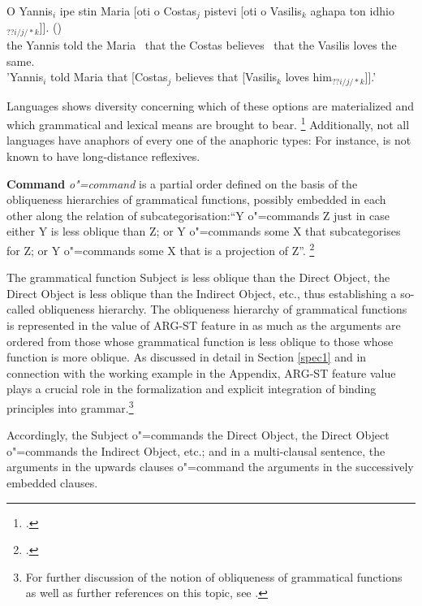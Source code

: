 \documentclass[output=paper
	        ,collection
	        ,collectionchapter
 	        ,biblatex
                ,babelshorthands
                ,newtxmath
                ,draftmode
                ,colorlinks, citecolor=brown
]{langscibook}
\begin{document}
\enlargethispage*{2mm}

\begin{exe}
\ex
\gll O Yannis$_{i}$ ipe stin Maria [oti o Costas$_{j}$ pistevi [oti o Vasilis$_{k}$ aghapa ton
idhio$_{??i/j/*k}$]]. ()
\\ 
the Yannis told the Maria \mbox{ }that the Costas believes \mbox{ }that the Vasilis loves the same.\\
\trans 'Yannis$_{i}$ told Maria that [Costas$_{j}$ believes that [Vasilis$_{k}$ loves
him$_{??i/j/*k}$]].'
\end{exe}

Languages shows diversity concerning which of these options are materialized
and which grammatical and lexical means are brought to bear.%
\footnote{
\citep{dimitriadisDatabase:2005}.
}
Additionally, not all languages have anaphors of every one of the anaphoric types:
For instance,  is not known to have long-distance reflexives.

	
{\bf Command} {\em o"=command} is a partial order defined on the basis of the obliqueness hierarchies
of grammatical functions, possibly embedded in each other along the relation of
subcategorisation:``Y o"=commands Z just in case either Y is less
oblique than Z; or Y {\mbox o"=commands} some X that subcategorises for Z; or Y
o"=commands some X that is a projection of Z''.%
\footnote{\citep[]{polsag:hpsg94}.}

The grammatical function Subject is less oblique than the Direct Object, the Direct
Object is less oblique than the Indirect Object, etc., thus establishing a so-called obliqueness hierarchy. 
The obliqueness hierarchy
of grammatical functions is represented in the value of ARG-ST feature in as much as 
the arguments are ordered from those whose grammatical function is less oblique to those 
whose function is more oblique.
As discussed in detail in Section \ref{spec1} and in connection with the working example 
in the Appendix, ARG-ST feature value plays a crucial role in the formalization
and explicit integration of binding principles into grammar.\footnote{
For further discussion of the notion of obliqueness of grammatical functions as well as further references on
this topic, see \citep[Section~5.2]{polsag:hpsg87}.}

Accordingly, the Subject o"=commands the Direct Object, the Direct
Object o"=commands the Indirect Object, etc.;
and in a multi-clausal sentence,
the arguments in the upwards clauses o"=command the arguments in the
successively embedded clauses.
\end{document}
